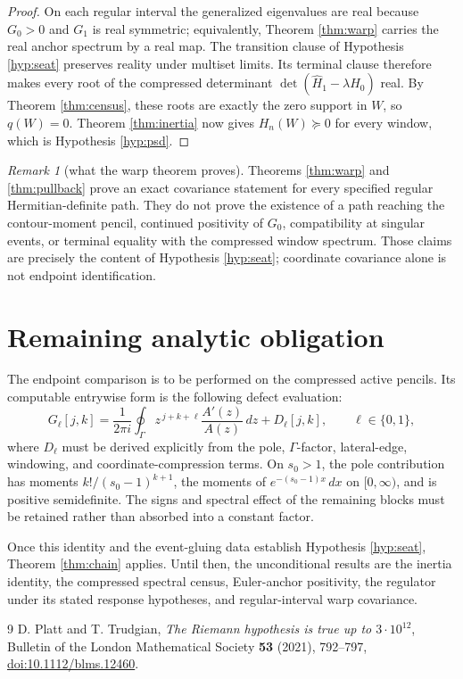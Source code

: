 \documentclass[11pt]{article}
\theoremstyle{plain}
\theoremstyle{definition}
\theoremstyle{remark}
\newtheorem{remark}[theorem]{Remark}
\begin{document}
\begin{proof}
On each regular interval the generalized eigenvalues are real because $G_0>0$ and
$G_1$ is real symmetric; equivalently, Theorem \ref{thm:warp} carries the real anchor
spectrum by a real map. The transition clause of Hypothesis \ref{hyp:seat} preserves
reality under multiset limits. Its terminal clause therefore makes every root of the
compressed determinant
$\det(\widehat H_1-\lambda\widehat H_0)$ real. By Theorem \ref{thm:census}, these roots
are exactly the zero support in $W$, so $q(W)=0$. Theorem \ref{thm:inertia} now gives
$H_n(W)\succeq0$ for every window, which is Hypothesis \ref{hyp:psd}.
\end{proof}

\begin{remark}[what the warp theorem proves]
Theorems \ref{thm:warp} and \ref{thm:pullback} prove an exact covariance statement for
every specified regular Hermitian-definite path. They do not prove the existence of a
path reaching the contour-moment pencil, continued positivity of $G_0$, compatibility
at singular events, or terminal equality with the compressed window spectrum. Those
claims are precisely the content of Hypothesis \ref{hyp:seat}; coordinate covariance
alone is not endpoint identification.
\end{remark}

\section{Remaining analytic obligation}\label{sec:obligations}

The endpoint comparison is to be performed on the compressed active pencils. Its
computable entrywise form is the following defect evaluation:
\[
  G_\ell[j,k]
  =\frac{1}{2\pi i}\oint_\Gamma
    z^{\,j+k+\ell}\frac{A'(z)}{A(z)}\,dz
   +D_\ell[j,k],
  \qquad \ell\in\{0,1\},
\]
where $D_\ell$ must be derived explicitly from the pole, $\Gamma$-factor, lateral-edge,
windowing, and coordinate-compression terms. On $s_0>1$, the pole contribution has
moments $k!/(s_0-1)^{k+1}$, the moments of
$e^{-(s_0-1)x}\,dx$ on $[0,\infty)$, and is positive semidefinite. The signs and spectral
effect of the remaining blocks must be retained rather than absorbed into a constant
factor.

Once this identity and the event-gluing data establish Hypothesis \ref{hyp:seat},
Theorem \ref{thm:chain} applies. Until then, the unconditional results are the inertia
identity, the compressed spectral census, Euler-anchor positivity, the regulator under
its stated response hypotheses, and regular-interval warp covariance.

\begin{thebibliography}{9}
D. Platt and T. Trudgian,
\emph{The Riemann hypothesis is true up to $3\cdot10^{12}$},
Bulletin of the London Mathematical Society \textbf{53} (2021), 792--797,
\href{https://doi.org/10.1112/blms.12460}{doi:10.1112/blms.12460}.
\end{thebibliography}
\end{document}
